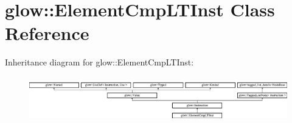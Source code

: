 \hypertarget{classglow_1_1_element_cmp_l_t_inst}{}\section{glow\+:\+:Element\+Cmp\+L\+T\+Inst Class Reference}
\label{classglow_1_1_element_cmp_l_t_inst}
Inheritance diagram for glow\+:\+:Element\+Cmp\+L\+T\+Inst\+:\begin{figure}[H]
\begin{center}
\leavevmode
\includegraphics[height=1.991111cm]{classglow_1_1_element_cmp_l_t_inst}
\end{center}
\end{figure}
